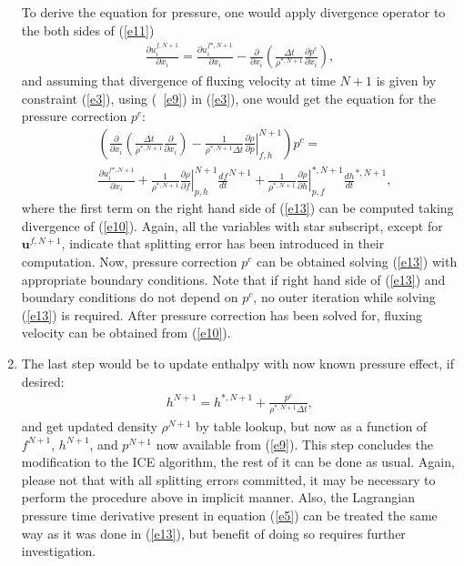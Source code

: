 \documentclass[fleqn,reqno]{amsart}
\newcommand{\pdd}[2]{\frac{\partial{#1}}{\partial{#2}}}
\newcommand{\ldd}[2]{\frac{d{#1}}{d{#2}}}
\begin{document}
\begin{enumerate}
{To derive the equation for pressure, one would apply divergence operator to the both sides of (\ref{e11})
\begin{align}
\label{e12}
\pdd{u^{f,N+1}_i}{x_i}=\pdd{u^{f*,N+1}_i}{x_i}-\pdd{}{x_i}\left(\frac{\Delta t}{\rho^{*,N+1}}\pdd{p^c}{x_i}\right),
\end{align}
and assuming that divergence of fluxing velocity at time $N+1$ is given by constraint (\ref{e3}),
using (~\ref{e9}) in (\ref{e3}), one would get the equation for the pressure correction $p^c$:
\begin{align}
\label{e13}
&\left(\pdd{}{x_i}\left(\frac{\Delta t}{\rho^{*,N+1}}\pdd{}{x_i}\right) 
-\frac{1}{\rho^{*,N+1} \Delta t}\left.\pdd{\rho}{p}\right|_{f,h}^{N+1}\right)p^c=\nonumber\\
&\pdd{u^{f*,N+1}_i}{x_i} + 
\frac{1}{\rho^{*,N+1}}\left.\pdd{\rho}{f}\right|_{p,h}^{N+1}{\ldd{f}{t}}^{N+1}+
\frac{1}{\rho^{*,N+1}}\left.\pdd{\rho}{h}\right|_{p,f}^{*,N+1}{\ldd{h}{t}}^{*,N+1},
\end{align}
where the first term on the right hand side of (\ref{e13}) can be computed taking divergence of (\ref{e10}).
Again, all the variables with star subscript, except for $\boldsymbol{u}^{f,N+1}$, indicate that splitting
error has been introduced in their computation.
Now, pressure correction $p^c$ can be obtained solving (\ref{e13}) with appropriate boundary conditions.
Note that if right hand side of (\ref{e13}) and boundary conditions do not depend on $p^c$, no outer
iteration while solving (\ref{e13}) is required. After pressure correction has been solved for,
fluxing velocity can be obtained from (\ref{e10}).}

\item{The last step would be to update enthalpy with now known pressure effect, if desired:
\begin{align}
\label{e14}
h^{N+1}=h^{*,N+1}+\frac{p^c}{\rho^{*,N+1}\Delta t},
\end{align}
and get updated density $\rho^{N+1}$ by table lookup, but now as a function of $f^{N+1}$, ${h^{N+1}}$, and $p^{N+1}$ now
available from (\ref{e9}).
This step concludes the modification to the ICE algorithm, the rest of it can be done as usual.
Again, please not that with all splitting errors committed, it may be necessary to perform the procedure above
in implicit manner. Also, the Lagrangian pressure time derivative present in equation (\ref{e5}) can be
treated the same way as it was done in (\ref{e13}), but benefit of doing so requires further investigation.}
\end{enumerate}
\end{document}
